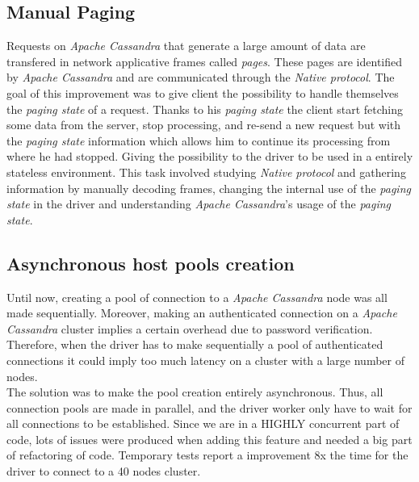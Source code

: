 \documentclass[a4paper]{report}
\newcommand{\ca}{\emph{Apache Cassandra\xspace}}
\begin{document}
\subsection{Manual Paging}
Requests on \ca{} that generate a large amount of data are transfered in network applicative frames called \emph{pages}. These pages are identified by \ca{} and are communicated through the \emph{Native protocol}. The goal of this improvement was to give client the possibility to handle themselves the \emph{paging state} of a request. Thanks to his \emph{paging state} the client start fetching some data from the server, stop processing, and re-send a new request but with the \emph{paging state} information which allows him to continue its processing from where he had stopped. Giving the possibility to the driver to be used in a entirely stateless environment. This task involved studying \emph{Native protocol} and gathering information by manually decoding frames, changing the internal use of the \emph{paging state} in the driver and understanding \ca{}'s usage of the \emph{paging state}.
\subsection{Asynchronous host pools creation} %
\label{sub:asynchronous_host_pools_creation}

Until now, creating a pool of connection to a \ca{} node was all made sequentially. Moreover, making an authenticated connection on a \ca{} cluster implies a certain overhead due to password verification. Therefore, when the driver has to make sequentially a pool of authenticated connections it could imply too much latency on a cluster with a large number of nodes.\\
The solution was to make the pool creation entirely asynchronous. Thus, all connection pools are made in parallel, and the driver worker only have to wait for all connections to be established. Since we are in a HIGHLY concurrent part of code, lots of issues were produced when adding this feature and needed a big part of refactoring of code. Temporary tests report a improvement 8x the time for the driver to connect to a 40 nodes cluster.
\end{document}
